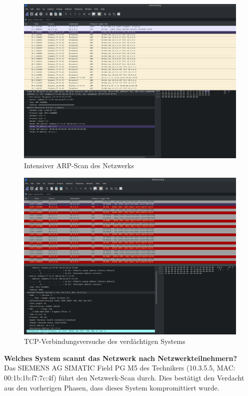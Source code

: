 \documentclass[
    a4paper,
    pagesize,
	pdftex,
    12pt,
]{scrartcl}
\begin{document}
\begin{figure}[H]
    \centering
    \includegraphics[width=\textwidth]{ws-arp-scan.png}
    \caption{Intensiver ARP-Scan des Netzwerks}
    \label{fig:ws-arp-scan}
\end{figure}

\begin{figure}[H]
    \centering
    \includegraphics[width=\textwidth]{ws-port-scan.png}
    \caption{TCP-Verbindungsversuche des verdächtigen Systems}
    \label{fig:ws-arp-scan}
\end{figure}

\textbf{Welches System scannt das Netzwerk nach Netzwerkteilnehmern?}
\\
Das SIEMENS AG SIMATIC Field PG M5 des Technikers (10.3.5.5, MAC: 00:1b:1b:f7:7c:4f) führt den Netzwerk-Scan durch. Dies bestätigt den Verdacht aus den vorherigen Phasen, dass dieses System kompromittiert wurde.
\end{document}
